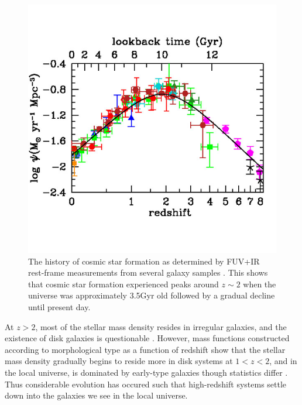 \begin{figure}
\centering
\includegraphics[width=5in]{Figures/MadauDickinson2014.jpg}
\caption[The history of cosmic star formation.]{The history of cosmic star formation as determined by FUV+IR rest-frame measurements from several galaxy samples \citep[credit:][and references therein]{Madau2014}. This shows that cosmic star formation experienced peaks around $z\sim2$ when the universe was approximately 3.5Gyr old followed by a gradual decline until present day.}
\label{fig: SFR density}
\end{figure}

At $z>2$, most of the stellar mass density resides in irregular galaxies, and the existence of disk galaxies is questionable \citep{Dickinson2000,Papovich2005,Cameron2011,Conselice2005,Conselice2011,Buitrago2013}. However, mass functions constructed according to morphological type as a function of redshift show that the stellar mass density gradually begins to reside more in disk systems at $1<z<2$, and in the local universe, is dominated by early-type galaxies though statistics differ \citep{Brinchmann2000, Bell2003, Bundy2005, Mortlock2013, Kelvin2014, HuertasCompany2016, Thanjavur2016}. Thus considerable evolution has occured such that high-redshift systems settle down into the galaxies we see in the local universe.

